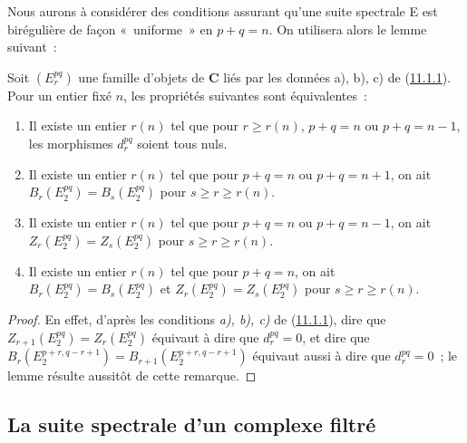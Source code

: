 \begin{env}[11.1.9]
\label{0.11.1.9-fr}
Nous aurons à considérer des conditions assurant qu'une suite spectrale E est
birégulière de façon «~uniforme~» en $p+q=n$. On utilisera alors le lemme
suivant~:
\end{env}

\begin{lemma}[11.1.10]
\label{0.11.1.10-fr}
Soit $(E_r^{pq})$ une famille d'objets de $\mathbf{C}$ liés par les données
\textup{a), b), c)} de \textup{(\hyperref[0.11.1.1-fr]{11.1.1})}. Pour un entier fixé $n$, les
propriétés suivantes sont équivalentes~:
\begin{enumerate}
  \item[\textup{a)}] Il existe un entier $r(n)$ tel que pour $r\geq r(n)$,
    $p+q=n$ ou $p+q=n-1$, les morphismes $d_r^{pq}$ soient tous nuls.
  \item[\textup{b)}] Il existe un entier $r(n)$ tel que pour $p+q=n$ ou $p+q=n+1$,
    on ait $B_r(E_2^{pq})=B_s(E_2^{pq})$ pour $s\geq r\geq r(n)$.
  \item[\textup{c)}] Il existe un entier $r(n)$ tel que pour $p+q=n$ ou $p+q=n-1$,
    on ait $Z_r(E_2^{pq})=Z_s(E_2^{pq})$ pour $s\geq r\geq r(n)$.
  \item[\textup{d)}] Il existe un entier $r(n)$ tel que pour $p+q=n$, on ait
    $B_r(E_2^{pq})=B_s(E_2^{pq})$ et $Z_r(E_2^{pq})=Z_s(E_2^{pq})$ pour
    $s\geq r\geq r(n)$.
\end{enumerate}
\end{lemma}

\begin{proof}
En effet, d'après les conditions \emph{a), b), c)} de
(\hyperref[0.11.1.1-fr]{11.1.1}), dire que
$Z_{r+1}(E_2^{pq})=Z_r(E_2^{pq})$ équivaut à dire que $d_r^{pq}=0$, et dire
que
$B_r(E_2^{p+r,q-r+1})=B_{r+1}(E_2^{p+r,q-r+1})$ équivaut aussi à dire que
$d_r^{pq}=0$~; le lemme résulte aussitôt de cette remarque.
\end{proof}
\subsection{La suite spectrale d'un complexe filtré}
\label{subsection:0.11.2-fr}

